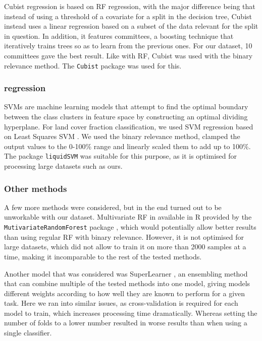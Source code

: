 \documentclass[a4paper,10pt]{article}
\begin{document}
Cubist regression \citep{cubist} is based on \gls{RF} regression, with the major difference being that instead of using a threshold of a covariate for a split in the decision tree, Cubist instead uses a linear regression based on a subset of the data relevant for the split in question.
In addition, it features committees, a boosting technique that iteratively trains trees so as to learn from the previous ones.
For our dataset, 10 committees gave the best result.
Like with \gls{RF}, Cubist was used with the binary relevance method.
The \texttt{Cubist} package \citep{cubistpackage} was used for this.

\subsubsection{ regression}

\Glspl{SVM} are machine learning models that attempt to find the optimal boundary between the class clusters in feature space by constructing an optimal dividing hyperplane.
For land cover fraction classification, we used \gls{SVM} regression based on Least Squares \gls{SVM} \citep{suykens_least_1999}.
We used the binary relevance method, clamped the output values to the 0-100\% range and linearly scaled them to add up to 100\%.
The package \texttt{liquidSVM} \citep{liquidSVM} was suitable for this purpose, as it is optimised for processing large datasets such as ours.

\subsubsection{Other methods}

A few more methods were considered, but in the end turned out to be unworkable with our dataset.
Multivariate \gls{RF} in available in R provided by the \texttt{MutivariateRandomForest} package \citep{MultivariateRandomForest}, which would potentially allow better results than using regular \gls{RF} with binary relevance.
However, it is not optimised for large datasets, which did not allow to train it on more than 2000 samples at a time, making it incomparable to the rest of the tested methods.

Another model that was considered was SuperLearner \citep{SuperLearner}, an ensembling method that can combine multiple of the tested methods into one model, giving models different weights according to how well they are known to perform for a given task.
Here we ran into similar issues, as cross-validation is required for each model to train, which increases processing time dramatically.
Whereas setting the number of folds to a lower number resulted in worse results than when using a single classifier.
\end{document}
